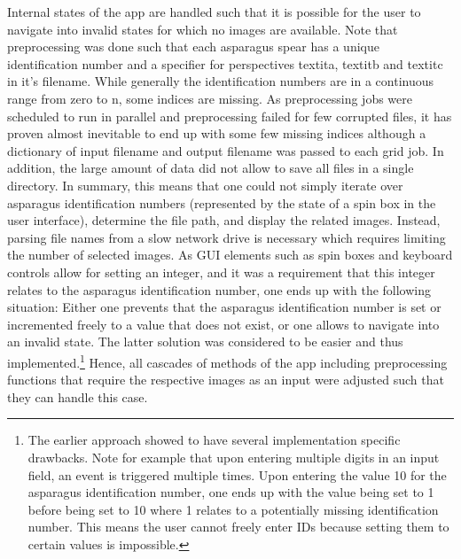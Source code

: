 Internal states of the app are handled such that it is possible for the user to navigate into invalid states for which no images are available. Note that preprocessing was done such that each asparagus spear has a unique identification number and a specifier for perspectives textit{a}, textit{b} and textit{c} in it’s filename. While generally the identification numbers are in a continuous range from zero to n, some indices are missing. As preprocessing jobs were scheduled to run in parallel and preprocessing failed for few corrupted files, it has proven almost inevitable to end up with some few missing indices although a dictionary of input filename and output filename was passed to each grid job. In addition, the large amount of data did not allow to save all files in a single directory. In summary, this means that one could not simply iterate over asparagus identification numbers (represented by the state of a spin box in the user interface), determine the file path, and display the related images. Instead, parsing file names from a slow network drive is necessary which requires limiting the number of selected images. As GUI elements such as spin boxes and keyboard controls allow for setting an integer, and it was a requirement that this integer relates to the asparagus identification number, one ends up with the following situation: Either one prevents that the asparagus identification number is set or incremented freely to a value that does not exist, or one allows to navigate into an invalid state. The latter solution was considered to be easier and thus implemented.\footnote{The earlier approach showed to have several implementation specific drawbacks. Note for example that upon entering multiple digits in an input field, an event is triggered multiple times. Upon entering the value 10 for the asparagus identification number, one ends up with the value being set to 1 before being set to 10 where 1 relates to a potentially missing identification number. This means the user cannot freely enter IDs because setting them to certain values is impossible.} Hence, all cascades of methods of the app including preprocessing functions that require the respective images as an input were adjusted such that they can handle this case. 

